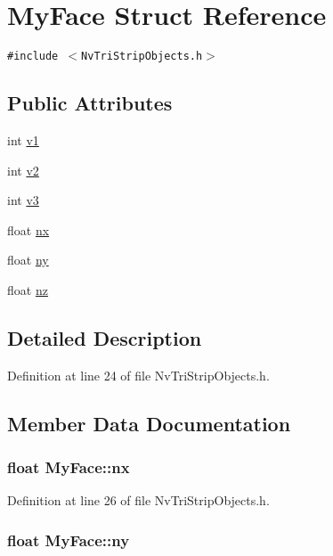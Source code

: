 \hypertarget{struct_my_face}{
\section{MyFace Struct Reference}
\label{struct_my_face}
}
{\tt \#include $<$NvTriStripObjects.h$>$}

\subsection*{Public Attributes}
\begin{CompactItemize}
\item 
int \hyperlink{struct_my_face_1283eaadb0b4dc40dad697435a4690ac}{v1}
\item 
int \hyperlink{struct_my_face_cfc0eda523642a52df86c7c85d90193c}{v2}
\item 
int \hyperlink{struct_my_face_d3c6461df194c56250abbca8603a65b5}{v3}
\item 
float \hyperlink{struct_my_face_1d7ab6d50610b976629d3d65e96c68a7}{nx}
\item 
float \hyperlink{struct_my_face_3d09cbfd8b8edf2a946046d264a1ddf3}{ny}
\item 
float \hyperlink{struct_my_face_9b8303783e6ece8c61fbb429701692a3}{nz}
\end{CompactItemize}


\subsection{Detailed Description}


Definition at line 24 of file NvTriStripObjects.h.

\subsection{Member Data Documentation}
\hypertarget{struct_my_face_1d7ab6d50610b976629d3d65e96c68a7}{
\subsubsection[{nx}]{\setlength{\rightskip}{0pt plus 5cm}float {\bf MyFace::nx}}}
\label{struct_my_face_1d7ab6d50610b976629d3d65e96c68a7}




Definition at line 26 of file NvTriStripObjects.h.\hypertarget{struct_my_face_3d09cbfd8b8edf2a946046d264a1ddf3}{
\subsubsection[{ny}]{\setlength{\rightskip}{0pt plus 5cm}float {\bf MyFace::ny}}}
\label{struct_my_face_3d09cbfd8b8edf2a946046d264a1ddf3}




